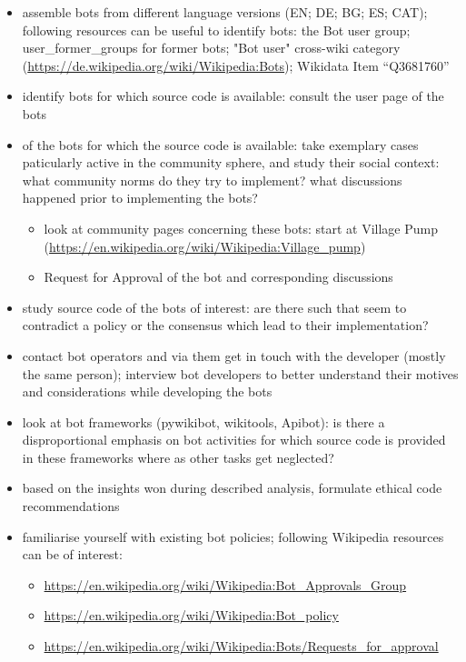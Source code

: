 \documentclass[pdftex,a4paper,11pt]{scrartcl}
\begin{document}
\begin{itemize}
    \item assemble bots from different language versions (EN; DE; BG; ES; CAT); following resources can be useful to identify bots: the Bot user group; user\_former\_groups for former bots; "Bot user" cross-wiki category (\url{https://de.wikipedia.org/wiki/Wikipedia:Bots}); Wikidata Item “Q3681760”
    \item identify bots for which source code is available: consult the user page of the bots
    \item of the bots for which the source code is available: take exemplary cases paticularly active in the community sphere, and study their social context: what community norms do they try to implement? what discussions happened prior to implementing the bots?
    \begin{itemize}
        \item look at community pages concerning these bots: start at Village Pump (\url{https://en.wikipedia.org/wiki/Wikipedia:Village_pump})
        \item Request for Approval of the bot and corresponding discussions
    \end{itemize}
    \item study source code of the bots of interest: are there such that seem to contradict a policy or the consensus which lead to their implementation?
    \item contact bot operators and via them get in touch with the developer (mostly the same person); interview bot developers to better understand their motives and considerations while developing the bots
    \item look at bot frameworks (pywikibot, wikitools, Apibot): is there a disproportional emphasis on bot activities for which source code is provided in these frameworks where as other tasks get neglected?
    \item based on the insights won during described analysis, formulate ethical code recommendations
    \item familiarise yourself with existing bot policies; following Wikipedia resources can be of interest:
    \begin{itemize}
        \item \url{https://en.wikipedia.org/wiki/Wikipedia:Bot_Approvals_Group}
        \item \url{https://en.wikipedia.org/wiki/Wikipedia:Bot_policy}
        \item \url{https://en.wikipedia.org/wiki/Wikipedia:Bots/Requests_for_approval}
    \end{itemize}
\end{itemize}
\end{document}
